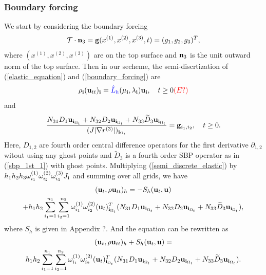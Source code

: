 \documentclass[a4paper]{article}
\newcommand{\wt}{\widetilde}
\begin{document}
\subsubsection{Boundary forcing}
We start by considering the boundary forcing
\begin{equation}\label{boundary_forcing}
\mathcal{T}\cdot{\bf n}_3 = {\bf g}(x^{(1)},x^{(2)},x^{(3)},t) = (g_1,g_2,g_3)^T,
\end{equation}
where $(x^{(1)},x^{(2)},x^{(3)})$ are on the top surface and ${\bf n}_3$ is the unit outward norm of the top surface. Then in our secheme, the semi-discrtization of (\ref{elastic_equation}) and (\ref{boundary_forcing}) are
\begin{equation}\label{semi_discrete_elastic}
\rho_{\bf i}({\bf u}_{tt})_{\bf i} = {\color{blue}\hat{L}_h}(\mu_{\bf i},\lambda_{\bf i}){\bf u}_{\bf i}, \ \ \ t\geq0  {\color{red}(E?)}
\end{equation}
and
\begin{equation}\label{discrete_boundary_forcing}
\frac{N_{31} D_1 {\bf u}_{{\bf i}_{\Omega_t}} + N_{32} D_2 {\bf u}_{{\bf i}_{\Omega_t}} + N_{33} \wt{D}_3 {\bf u}_{{\bf i}_{\Omega_t}}}{(J|\nabla r^{(3)}|)_{{\bf i}_{\Omega_t}}}  = {\bf g}_{i_1,i_2}, \ \ \ t\geq0.
\end{equation}
Here, $D_{1,2}$ are fourth order central difference operators for the first derivative $\partial_{1,2}$ witout using any ghost points and $\wt{D}_3$ is a fourth order SBP operator as in (\ref{sbp_1st_1}) with ghost points. Multiplying (\ref{semi_discrete_elastic}) by $h_1h_2h_3\omega_{i_1}^{(1)}\omega_{i_2}^{(2)}\omega_{i_3}^{(3)}J_{\bf i}$ and summing over all grids, we have
\begin{multline*}
({\bf u}_t,\rho{\bf u}_{tt})_h = -S_h({\bf u}_t,{\bf u}) \\
+ h_1h_2\sum_{i_1=1}^{n_1}\sum_{i_2=1}^{n_2}\omega_{i_1}^{(1)}\omega_{i_2}^{(2)}({\bf u}_t)_{{\bf i}_{\Omega_t}}^T(N_{31}D_1{\bf u}_{{\bf i}_{\Omega_t}} + N_{32}D_2{\bf u}_{{\bf i}_{\Omega_t}} +N_{33}\wt{D}_3{\bf u}_{{\bf i}_{\Omega_t}}),
\end{multline*}
where $S_h$ is given in Appendix ?. And the equation can be rewritten as
\begin{multline}\label{time_derivative_energy}
({\bf u}_t,\rho{\bf u}_{tt})_h + S_h({\bf u}_t,{\bf u}) = \\
h_1h_2\sum_{i_1=1}^{n_1}\sum_{i_2=1}^{n_2}\omega_{i_1}^{(1)}\omega_{i_2}^{(2)}({\bf u}_t)_{{\bf i}_{\Omega_t}}^T(N_{31}D_1{\bf u}_{{\bf i}_{\Omega_t}} + N_{32}D_2{\bf u}_{{\bf i}_{\Omega_t}} +N_{33}\wt{D}_3{\bf u}_{{\bf i}_{\Omega_t}}).
\end{multline}
\end{document}
